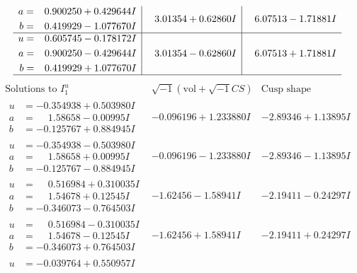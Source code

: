 \documentclass[1p]{elsarticle_modified}
\theoremstyle{definition}
\newcommand{\I}{\sqrt{-1}}
\begin{document}
$$\begin{array}{c|c|c}
\begin{aligned}
a &= \phantom{-}0.900250 + 0.429644 I \\
b &= \phantom{-}0.419929 - 1.077670 I\end{aligned}
 & \phantom{-}3.01354 + 0.62860 I & \phantom{-}6.07513 - 1.71881 I \\ \hline\begin{aligned}
u &= \phantom{-}0.605745 - 0.178172 I \\
a &= \phantom{-}0.900250 - 0.429644 I \\
b &= \phantom{-}0.419929 + 1.077670 I\end{aligned}
 & \phantom{-}3.01354 - 0.62860 I & \phantom{-}6.07513 + 1.71881 I\\
 \hline 
 \end{array}$$\newpage$$\begin{array}{c|c|c}  
\text{Solutions to }I^u_{1}& \I (\text{vol} + \sqrt{-1}CS) & \text{Cusp shape}\\
 \hline 
\begin{aligned}
u &= -0.354938 + 0.503980 I \\
a &= \phantom{-}1.58658 - 0.00995 I \\
b &= -0.125767 + 0.884945 I\end{aligned}
 & -0.096196 + 1.233880 I & -2.89346 + 1.13895 I \\ \hline\begin{aligned}
u &= -0.354938 - 0.503980 I \\
a &= \phantom{-}1.58658 + 0.00995 I \\
b &= -0.125767 - 0.884945 I\end{aligned}
 & -0.096196 - 1.233880 I & -2.89346 - 1.13895 I \\ \hline\begin{aligned}
u &= \phantom{-}0.516984 + 0.310035 I \\
a &= \phantom{-}1.54678 + 0.12545 I \\
b &= -0.346073 - 0.764503 I\end{aligned}
 & -1.62456 - 1.58941 I & -2.19411 - 0.24297 I \\ \hline\begin{aligned}
u &= \phantom{-}0.516984 - 0.310035 I \\
a &= \phantom{-}1.54678 - 0.12545 I \\
b &= -0.346073 + 0.764503 I\end{aligned}
 & -1.62456 + 1.58941 I & -2.19411 + 0.24297 I \\ \hline\begin{aligned}
u &= -0.039764 + 0.550957 I \\

\end{aligned}
\end{array}$$
\end{document}
